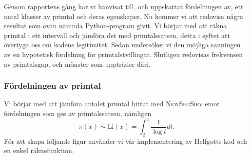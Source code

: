 
Genom rapportens gång har vi hänvisat till, och uppskattat fördelningen av, ett antal klasser av primtal och deras egenskaper. 
Nu kommer vi att redovisa några resultat som ovan nämnda Python-program givit.
Vi börjar med att räkna primtal i ett intervall och jämföra det med primtalssatsen, detta i syftet att övertyga oss om kodens legitimitet. 
Sedan undersöker vi den möjliga sanningen av en hypotetisk fördelning för primtalstvillingar. 
Slutligen redovisas frekvensen av primtalsgap, och mönster som uppträder däri.

\subsubsection{Fördelningen av primtal}\label{app.primes.title}

Vi börjar med att jämföra antalet primtal hittat med \textsc{NewSegSiev} emot fördelningen som ges av primtalssatsen, nämligen
\begin{equation}
    \pi(x) \sim \text{Li}(x) = \int_2^x\frac{1}{\log t}dt\label{app.primes.PNT}.
\end{equation}
För att skapa följande figur använder vi vår implementering av Helfgotts kod och en enkel räknefunktion.

